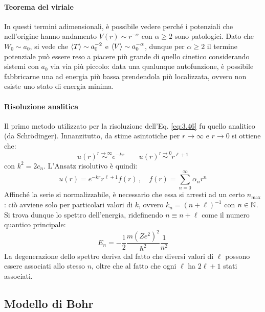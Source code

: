 \paragraph{Teorema del viriale}

In questi termini adimensionali, è possibile vedere perché i potenziali che nell'origine hanno andamento $ V(r) \sim r^{-\alpha} $ con $ \alpha \ge 2 $ sono patologici. Dato che $ W_0 \sim a_0 $, si vede che $ \braket{T} \sim a_0^{-2} $ e $ \braket{V} \sim a_0^{-\alpha} $, dunque per $ \alpha \ge 2 $ il termine potenziale può essere reso a piacere più grande di quello cinetico considerando sistemi con $ a_0 $ via via più piccolo: data una qualunque autofunzione, è possibile fabbricarne una ad energia più bassa prendendola più localizzata, ovvero non esiste uno stato di energia minima.

\paragraph{Risoluzione analitica}

Il primo metodo utilizzato per la risoluzione dell'Eq. \ref{eq:3.46} fu quello analitico (da Schrödinger). Innanzitutto, da stime asintotiche per $ r \rightarrow \infty $ e $ r \rightarrow 0 $ si ottiene che:
\begin{equation*}
	u(r) \overset{r \rightarrow \infty}{\sim} e^{-kr} \qquad u(r) \overset{r \rightarrow 0}{\sim} r^{\ell + 1}
\end{equation*}
con $ k^2 = 2c_n $.
L'Ansatz risolutivo è quindi:
\begin{equation*}
	u(r) = e^{-kr} r^{\ell + 1} f(r) \,, \quad f(r) = \sum_{n = 0}^{\infty} \alpha_n r^n
\end{equation*}
Affinché la serie si normalizzabile, è necessario che essa si arresti ad un certo $ n_{\text{max}} $: ciò avviene solo per particolari valori di $ k $, ovvero $ k_n = (n + \ell)^{-1} $ con $ n \in \mathbb{N} $. Si trova dunque lo spettro dell'energia, ridefinendo $ n \equiv n + \ell $ come il numero quantico principale:
\begin{equation}
	E_n = -\frac{1}{2} \frac{m(Ze^2)^2}{\hbar^2} \frac{1}{n^2}
	\label{eq:3.47}
\end{equation}
La degenerazione dello spettro deriva dal fatto che diversi valori di $ \ell $ possono essere associati allo stesso $ n $, oltre che al fatto che ogni $ \ell $ ha $ 2\ell + 1 $ stati associati.

\subsection{Modello di Bohr}

